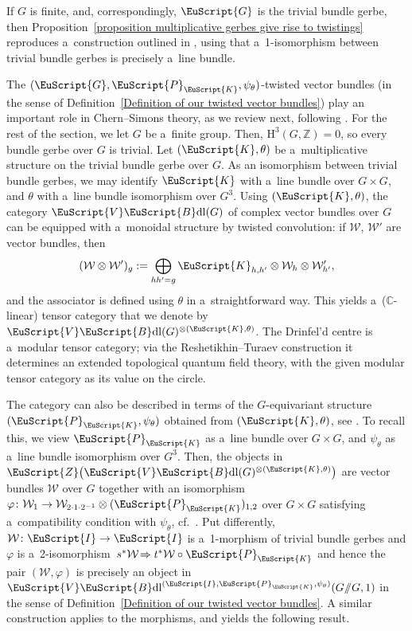 \documentclass[10pt,a4paper]{amsart}
\numberwithin{equation}{section}
\def\mathscr#1{\EuScript{#1}}
\def\C {\mathbb{C}}
\def\h {\mathrm{H}}
\def\act#1#2{#1/\!\!/#2}
\newcommand{\VectBdl}{\mathscr{V}\mathscr{B}\mathrm{dl}}
\begin{document}
\begin{Remark}
 If $G$ is finite, and, correspondingly, $\mathscr{G}$ is the trivial bundle gerbe, then Proposition~\ref{proposition multiplicative gerbes give rise to twistings} reproduces a~construction outlined in \cite[equation (4.5)]{freed6}, using that a~1-isomorphism between trivial bundle gerbes
 is precisely a~line bundle.
\end{Remark}

The $(\mathscr{G},\mathscr{P}_{\mathscr{K}},\psi_{\theta})$-twisted vector bundles (in the sense of Definition~\ref{Definition of our twisted vector bundles})
play an important role in Chern--Simons theory, as we review next, following \cite[Section~4]{freed6}.
For the rest of the section, we let $G$ be a~finite group.
Then, $\h^3(G,\mathbb{Z})=0$, so every bundle gerbe over $G$ is trivial.
Let $(\mathscr{K},\theta)$ be a~multiplicative structure on the trivial bundle gerbe over $G$. As an isomorphism between trivial bundle gerbes, we may identify $\mathscr{K}$ with a~line bundle over $G \times G$, and $\theta$ with a~line bundle isomorphism over $G^3$.
Using $(\mathscr{K},\theta)$, the category $\VectBdl(G)$ of complex vector bundles over $G$ can be equipped with a~monoidal structure by twisted convolution: if $\mathcal{W}$, $\mathcal{W}'$ are vector bundles, then
\[
 (\mathcal{W} \otimes \mathcal{W}')_g := \bigoplus_{hh'=g} \mathscr{K}_{h,h'} \otimes \mathcal{W}_h \otimes \mathcal{W}'_{h'},
\]
and the associator is defined using $\theta$ in a~straightforward way.
This yields a~($\C$-linear) tensor category that we denote by $\VectBdl(G)^{\otimes (\mathscr{K},\theta)}$.
The Drinfel'd centre \smash{$\mathscr{Z}\bigl(\VectBdl(G)^{\otimes (\mathscr{K},\theta)}\bigr)$} is a~modular tensor category; via the Reshetikhin--Turaev construction it
 determines an extended topological quantum field theory, with the given modular tensor category as its value on the circle.

 The category
 \smash{$\mathscr{Z}\bigl(\VectBdl(G)^{\otimes (\mathscr{K},\theta)}\bigr)$} can also be described in terms of the $G$-equivariant structure $(\mathscr{P}_{\mathscr{K}},\psi_{\theta})$ obtained from $(\mathscr{K},\theta)$, see \cite[Proposition 4.9]{freed6}. To recall this, we view $\mathscr{P}_{\mathscr{K}}$ as a~line bundle over $G \times G$, and $\psi_{\theta}$ as a~line bundle isomorphism over $G^3$.
 Then, the objects in $\mathscr{Z}\bigl(\VectBdl(G)^{\otimes (\mathscr{K},\theta)}\bigr)$ are vector bundles $\mathcal{W}$ over $G$ together with an iso\-morphism
 $\varphi \colon \mathcal{W}_1 \to \mathcal{W}_{2\cdot 1\cdot 2^{-1}} \otimes (\mathscr{P}_{\mathscr{K}})_{1,2}$ over $G \times G$ satisfying a~compatibility condition with $\psi_{\theta}$, cf.\ \cite[equation~4.9]{freed6}.
 Put differently, $\mathcal{W} \colon \mathscr{I} \to \mathscr{I}$ is a~1-morphism of trivial bundle gerbes and $\varphi$
 is a~2-isomor\-phism~${s^*\mathcal{W} \!\Rightarrow t^*\mathcal{W} \circ \mathscr{P}_{\mathscr{K}}}$ and hence the pair $(\mathcal{W},\varphi)$ is precisely an object in
 $\VectBdl^{(\mathscr{I},\mathscr{P}_{\mathscr{K}},\psi_{\theta})}(\act GG,1)$ in the sense of Definition~\ref{Definition of our twisted vector bundles}. A similar construction applies to the morphisms, and yields the following result.
\end{document}
